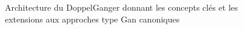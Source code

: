             \begin{figure}[H]
                \centering
                \caption{Architecture du DoppelGanger donnant les concepts clés et les extensions aux approches type Gan canoniques}
            \end{figure}
